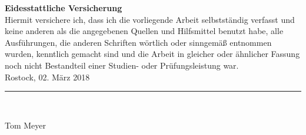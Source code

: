 \documentclass[english,
    ]{WissTemplate}
\renewcommand{\name}{Tom Meyer}
\begin{document}

\frontmatter

\tableofcontents
\newpage
\markright{\nomname}
\printnomenclature
\mainmatter









\newpage
\thispagestyle{empty}
\label{EidesstattlicheVersicherung}
\vspace*{8cm}%
{\parindent 0pt
    \textbf{\Huge{Eidesstattliche Versicherung}}\vspace{10mm}\\
    Hiermit versichere ich, dass ich die vorliegende Arbeit selbstständig verfasst und keine anderen als die angegebenen Quellen und Hilfsmittel benutzt habe, alle Ausführungen, die anderen Schriften wörtlich oder sinngemäß entnommen wurden, kenntlich gemacht sind und die Arbeit in gleicher oder ähnlicher Fassung noch nicht Bestandteil einer Studien- oder Prüfungsleistung war.
    \\[2cm]}
Rostock, 02. März 2018
\\[3cm]
\rule{6cm}{0.5pt}\\
\parbox[l][1cm][c]{6cm}{\hfill\name\hfill\vbox{}}
\end{document}
